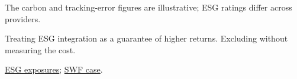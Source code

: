\begin{qfmethod}
 The carbon and tracking-error figures are illustrative; ESG ratings differ across providers.

 Treating ESG integration as a guarantee of higher returns. Excluding without measuring the cost.

 \hyperref[meth:esg-exposure-evaluation]{ESG exposures}; \hyperref[meth:swf-risk-case]{SWF case}.

\end{qfmethod}
